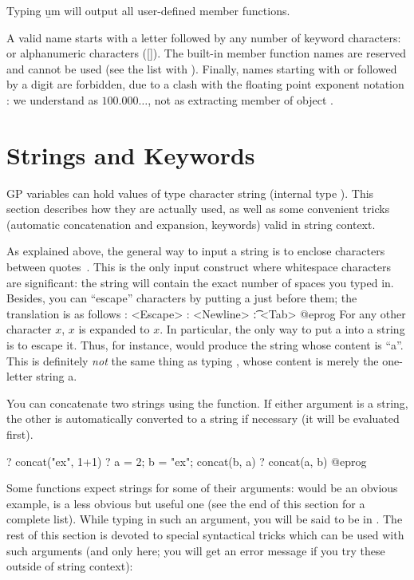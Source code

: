  Typing \b{um} will output all user-defined member functions.

 A valid name starts with a letter followed
by any number of keyword characters: \kbd{\_} or alphanumeric characters
([]). The built-in member function names are reserved and
cannot be used (see the list with ). Finally, names starting with
 or  followed by a digit are forbidden, due to a clash with
the floating point exponent notation : we understand  as
$100.000\dots$, not as extracting member  of object .

\section{Strings and Keywords}
\label{se:strings}

 GP variables can hold values of type character string
(internal type ). This section describes how they are actually used,
as well as some convenient tricks (automatic concatenation and expansion,
keywords) valid in string context.

As explained above, the general way to input a string is to enclose
characters between quotes~. This is the only input construct where
whitespace characters are significant: the string will contain the exact
number of spaces you typed in. Besides, you can ``escape'' characters by
putting a \kbd{\bs} just before them; the translation is as follows
\bprog
   \e: <Escape>
   \n: <Newline>
   \t: <Tab>
@eprog
For any other character $x$, \b{$x$} is expanded to $x$. In particular, the
only way to put a  into a string is to escape it. Thus, for
instance,  would produce the string whose content is
``a''. This is definitely \emph{not} the same thing as typing ,
whose content is merely the one-letter string a.

You can concatenate two strings using the  function. If either
argument is a string, the other is automatically converted to a string if
necessary (it will be evaluated first).

\bprog
? concat("ex", 1+1)
? a = 2; b = "ex"; concat(b, a)
? concat(a, b)
@eprog

Some functions expect strings for some of their arguments:  would
be an obvious example,  is a less obvious but useful one (see the
end of this section for a complete list). While typing in such an argument,
you will be said to be in . The rest of this section is
devoted to special syntactical tricks which can be used with such arguments
(and only here; you will get an error message if you try these outside of
string context):

